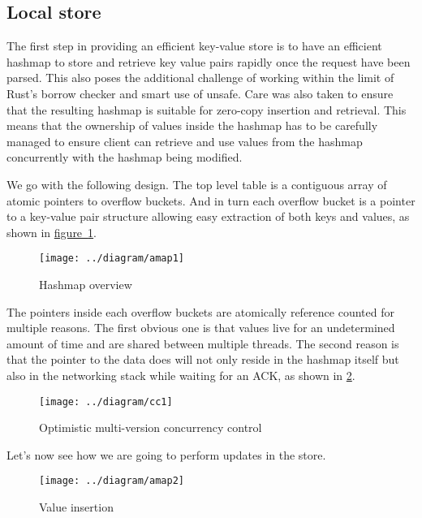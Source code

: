 \documentclass[11pt]{article}
\begin{document}
\subsection{Local store} \label{design-overview}

The first step in providing an efficient key-value store is to
have an efficient hashmap to store and retrieve key value pairs
rapidly once the request have been parsed. This also poses the
additional challenge of working within the limit of Rust's borrow
checker and smart use of unsafe. Care was also taken to ensure that
the resulting hashmap is suitable for zero-copy insertion and
retrieval. This means that the ownership of values inside the hashmap
has to be carefully managed to ensure client can retrieve and use
values from the hashmap concurrently with the hashmap being modified.

We go with the following design. The top level table is a contiguous
array of atomic pointers to overflow buckets. And in turn each
overflow bucket is a pointer to a key-value pair structure allowing
easy extraction of both keys and values, as shown in
\hyperref[fig:hashmap]{figure~\ref*{fig:hashmap}}.

\begin{figure}[h!]
  \texttt{[image: ../diagram/amap1]}
  \caption{Hashmap overview}
  \label{fig:hashmap}
\end{figure}

The pointers inside each overflow buckets are atomically reference
counted for multiple reasons. The first obvious one is that values
live for an undetermined amount of time and are shared between
multiple threads. The second reason is that the pointer to the data
does will not only reside in the hashmap itself but also in the
networking stack while waiting for an ACK, as shown in
\ref{fig:omvcc}.

\begin{figure}[h!]
  \texttt{[image: ../diagram/cc1]}
  \caption{Optimistic multi-version concurrency control}
  \label{fig:omvcc}
\end{figure}

Let's now see how we are going to perform updates in the store.

\begin{figure}[h!]
  \texttt{[image: ../diagram/amap2]}
  \caption{Value insertion}
  \label{fig:omvcc-insert}
\end{figure}
\end{document}
